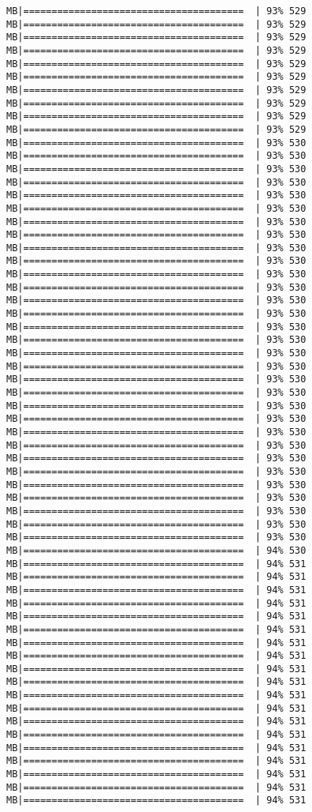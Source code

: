 \documentclass[
]{article}
\begin{document}
\begin{verbatim}
MB|=======================================  | 93% 529 MB|=======================================  | 93% 529 MB|=======================================  | 93% 529 MB|=======================================  | 93% 529 MB|=======================================  | 93% 529 MB|=======================================  | 93% 529 MB|=======================================  | 93% 529 MB|=======================================  | 93% 529 MB|=======================================  | 93% 529 MB|=======================================  | 93% 529 MB|=======================================  | 93% 530 MB|=======================================  | 93% 530 MB|=======================================  | 93% 530 MB|=======================================  | 93% 530 MB|=======================================  | 93% 530 MB|=======================================  | 93% 530 MB|=======================================  | 93% 530 MB|=======================================  | 93% 530 MB|=======================================  | 93% 530 MB|=======================================  | 93% 530 MB|=======================================  | 93% 530 MB|=======================================  | 93% 530 MB|=======================================  | 93% 530 MB|=======================================  | 93% 530 MB|=======================================  | 93% 530 MB|=======================================  | 93% 530 MB|=======================================  | 93% 530 MB|=======================================  | 93% 530 MB|=======================================  | 93% 530 MB|=======================================  | 93% 530 MB|=======================================  | 93% 530 MB|=======================================  | 93% 530 MB|=======================================  | 93% 530 MB|=======================================  | 93% 530 MB|=======================================  | 93% 530 MB|=======================================  | 93% 530 MB|=======================================  | 93% 530 MB|=======================================  | 93% 530 MB|=======================================  | 93% 530 MB|=======================================  | 93% 530 MB|=======================================  | 93% 530 MB|=======================================  | 94% 530 MB|=======================================  | 94% 531 MB|=======================================  | 94% 531 MB|=======================================  | 94% 531 MB|=======================================  | 94% 531 MB|=======================================  | 94% 531 MB|=======================================  | 94% 531 MB|=======================================  | 94% 531 MB|=======================================  | 94% 531 MB|=======================================  | 94% 531 MB|=======================================  | 94% 531 MB|=======================================  | 94% 531 MB|=======================================  | 94% 531 MB|=======================================  | 94% 531 MB|=======================================  | 94% 531 MB|=======================================  | 94% 531 MB|=======================================  | 94% 531 MB|=======================================  | 94% 531 MB|=======================================  | 94% 531 MB|=======================================  | 94% 531 
\end{verbatim}
\end{document}
